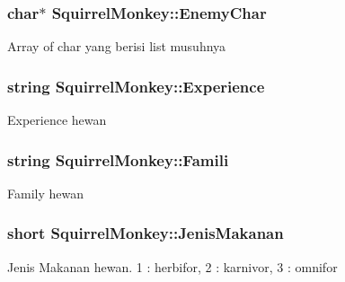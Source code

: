 \subsubsection[{\texorpdfstring{Enemy\+Char}{EnemyChar}}]{\setlength{\rightskip}{0pt plus 5cm}char$\ast$ Squirrel\+Monkey\+::\+Enemy\+Char\hspace{0.3cm}{\ttfamily [protected]}}\hypertarget{class_squirrel_monkey_a8f86426293e656d52b0bee7f1ed1de95}{}\label{class_squirrel_monkey_a8f86426293e656d52b0bee7f1ed1de95}
Array of char yang berisi list musuhnya 
\subsubsection[{\texorpdfstring{Experience}{Experience}}]{\setlength{\rightskip}{0pt plus 5cm}string Squirrel\+Monkey\+::\+Experience\hspace{0.3cm}{\ttfamily [protected]}}\hypertarget{class_squirrel_monkey_ab2bff3349257cff1ca81526e65b14518}{}\label{class_squirrel_monkey_ab2bff3349257cff1ca81526e65b14518}
Experience hewan 
\subsubsection[{\texorpdfstring{Famili}{Famili}}]{\setlength{\rightskip}{0pt plus 5cm}string Squirrel\+Monkey\+::\+Famili\hspace{0.3cm}{\ttfamily [protected]}}\hypertarget{class_squirrel_monkey_a2fffa2370eed2fc2e18d9a5f95c50aec}{}\label{class_squirrel_monkey_a2fffa2370eed2fc2e18d9a5f95c50aec}
Family hewan 
\subsubsection[{\texorpdfstring{Jenis\+Makanan}{JenisMakanan}}]{\setlength{\rightskip}{0pt plus 5cm}short Squirrel\+Monkey\+::\+Jenis\+Makanan\hspace{0.3cm}{\ttfamily [protected]}}\hypertarget{class_squirrel_monkey_a000ae715b4b00c9161921859353861d6}{}\label{class_squirrel_monkey_a000ae715b4b00c9161921859353861d6}
Jenis Makanan hewan. 1 \+: herbifor, 2 \+: karnivor, 3 \+: omnifor 
